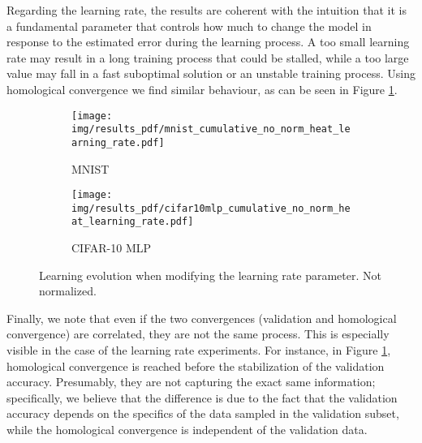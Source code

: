 \documentclass{article}
\begin{document}
Regarding the learning rate, the results are coherent with the intuition that it is a fundamental parameter that controls how much to change the model in response to the estimated error during the learning process. A too small learning rate may result in a long training process that could be stalled, while a too large value may fall in a fast suboptimal solution or an unstable training process. Using homological convergence we find similar behaviour, as can be seen in Figure \ref{fig:result_learning_rate}.


\begin{figure}[h]
\centering
\begin{subfigure}{.48\textwidth}
  \centering
  \texttt{[image: img/results\_pdf/mnist\_cumulative\_no\_norm\_heat\_learning\_rate.pdf]}
  \caption{MNIST}
\end{subfigure}
\begin{subfigure}{.48\textwidth}
  \centering
  \texttt{[image: img/results\_pdf/cifar10mlp\_cumulative\_no\_norm\_heat\_learning\_rate.pdf]}
  \caption{CIFAR-10 MLP}
\end{subfigure}
\caption{Learning evolution when modifying the learning rate parameter. Not normalized.}
\label{fig:result_learning_rate}
\end{figure}

Finally, we note that even if the two convergences (validation and homological convergence) are correlated, they are not the same process. This is especially visible in the case of the learning rate experiments. For instance, in Figure \ref{fig:result_learning_rate}, homological convergence is reached before the stabilization of the validation accuracy. Presumably, they are not capturing the exact same information; specifically, we believe that the difference is due to the fact that the validation accuracy depends on the specifics of the data sampled in the validation subset, while the homological convergence is independent of the validation data.





\end{document}
